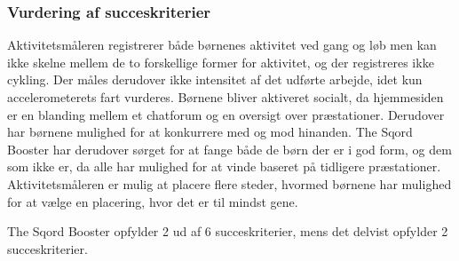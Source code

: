 \subsubsection{Vurdering af succeskriterier}
Aktivitetsmåleren registrerer både børnenes aktivitet ved gang og løb men kan ikke skelne mellem de to forskellige former for aktivitet, og der registreres ikke cykling. Der måles derudover ikke intensitet af det udførte arbejde, idet kun accelerometerets fart vurderes. \newline
Børnene bliver aktiveret socialt, da hjemmesiden er en blanding mellem et chatforum og en oversigt over præstationer. Derudover har børnene mulighed for at konkurrere med og mod hinanden. The Sqord Booster har derudover sørget for at fange både de børn der er i god form, og dem som ikke er, da alle har mulighed for at vinde baseret på tidligere præstationer. Aktivitetsmåleren er mulig at placere flere steder, hvormed børnene har mulighed for at vælge en placering, hvor det er til mindst gene.

The Sqord Booster opfylder 2 ud af 6 succeskriterier, mens det delvist opfylder 2 succeskriterier.

